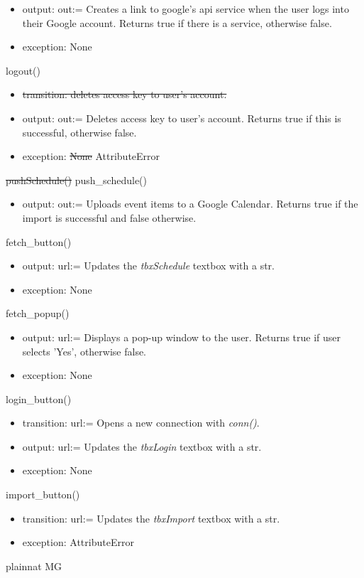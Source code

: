 \documentclass[12pt, titlepage]{article}
\begin{document}
\begin{itemize}
    \item output: out:= Creates a link to google's api service when the user logs into their Google account. Returns true if there is a service, otherwise false.
    \item exception: None
\end{itemize}
logout()
\begin{itemize}
    \item \sout{transition: deletes access key to user's account. }
    \item \color{blue}output: out:= Deletes access key to user's account. Returns true if this is successful, otherwise false.\color{black}
    \item exception: \sout{None} \color{blue}AttributeError\color{black}
\end{itemize}
\sout{pushSchedule()} \color{blue}push\_schedule()\color{black}
\begin{itemize}
    \item output: out:= Uploads event items to a Google Calendar. Returns true if the import is successful and false otherwise.
\end{itemize}
\color{blue}fetch\_button()\color{black}
\begin{itemize}
    \color{blue}\item output: url:= Updates the \emph{tbxSchedule} textbox with a str.\color{black}
    \color{blue}\item exception: None\color{black}
\end{itemize}
\color{blue}fetch\_popup()\color{black}
\begin{itemize}
    \color{blue}\item output: url:= Displays a pop-up window to the user. Returns true if user selects 'Yes', otherwise false.\color{black}
    \color{blue}\item exception: None\color{black}
\end{itemize}
\color{blue}login\_button()\color{black}
\begin{itemize}
    \color{blue}\item transition: url:= Opens a new connection with \emph{conn()}.\color{black}
    \color{blue}\item output: url:= Updates the \emph{tbxLogin} textbox with a str.\color{black}
    \color{blue}\item exception: None\color{black}
\end{itemize}
\color{blue}import\_button()\color{black}
\begin{itemize}
    \color{blue}\item transition: url:= Updates the \emph{tbxImport} textbox with a str.\color{black}
    \color{blue}\item exception: AttributeError\color{black}
\end{itemize}



 {plainnat}
 {MG}
\end{document}
